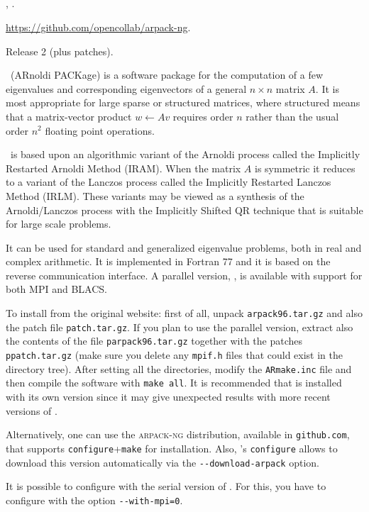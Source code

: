 \subsection*{\underline{\arpack}}
\begin{description}
\setlength{\itemsep}{0pt}
\item[References.]\citep{Lehoucq:1998:AUG}, \citep{Maschhoff:1996:PEP}.
\item[Website.] \url{https://github.com/opencollab/arpack-ng}.
\item[Version.] Release 2 (plus patches).
\item[Summary.] \arpack\ (ARnoldi PACKage) is a software package for the computation of a few eigenvalues and corresponding eigenvectors of a general $n\times n$ matrix $A$. It is most appropriate for large sparse or structured matrices, where structured means that a matrix-vector product $w \leftarrow Av$ requires order $n$ rather than the usual order $n^2$ floating point operations.

\arpack\ is based upon an algorithmic variant of the Arnoldi process called the Implicitly Restarted Arnoldi Method (IRAM). When the matrix $A$ is symmetric it reduces to a variant of the Lanczos process called the Implicitly Restarted Lanczos Method (IRLM). These variants may be viewed as a synthesis of the Arnoldi/Lanczos process with the Implicitly Shifted QR technique that is suitable for large scale problems.

It can be used for standard and generalized eigenvalue problems, both in real and complex arithmetic. It is implemented in Fortran 77 and it is based on the reverse communication interface. A parallel version, \parpack, is available with support for both MPI and BLACS.
\item[Installation.]
To install from the original website: first of all, unpack \texttt{arpack96.tar.gz} and also the patch file \texttt{patch.tar.gz}. If you plan to use the parallel version, extract also the contents of the file \texttt{parpack96.tar.gz} together with the patches \texttt{ppatch.tar.gz} (make sure you delete any \texttt{mpif.h} files that could exist in the directory tree). After setting all the directories, modify the \texttt{ARmake.inc} file and then compile the software with \texttt{make all}. It is recommended that \arpack is installed with its own \lapack version since it may give unexpected results with more recent versions of \lapack.

Alternatively, one can use the \textsc{arpack-ng} distribution, available in \texttt{github.com}, that supports \texttt{configure}+\texttt{make} for installation. Also, \slepc's \texttt{configure} allows to download this version automatically via the \texttt{-{}-download-arpack} option.

It is possible to configure \slepc with the serial version of \arpack. For this, you have to configure \petsc with the option \texttt{-{}-with-mpi=0}.
\end{description}

